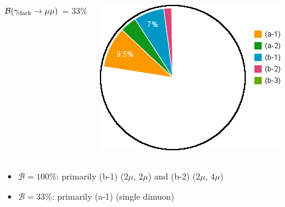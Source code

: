 \documentclass[compress]{beamer}
\newcommand{\s}[1]{{\mbox{\scriptsize #1}}}
\begin{document}
\begin{frame}
\begin{columns}
\centering $\mathcal{B}(\gamma_\s{dark} \to \mu\mu)$ = 33\%

\vspace{0.2 cm}
\includegraphics[width=0.9\linewidth]{chart2d_Br33.png}
\end{columns}

\vspace{0.5 cm}
\begin{itemize}
\item $\mathcal{B} = 100$\%: primarily (b-1) ($2\mu$, $2\mu$) and (b-2) ($2\mu$, $4\mu$)
\item $\mathcal{B} = 33$\%: primarily (a-1) (single dimuon)
\end{itemize}
\end{frame}

\end{document}
